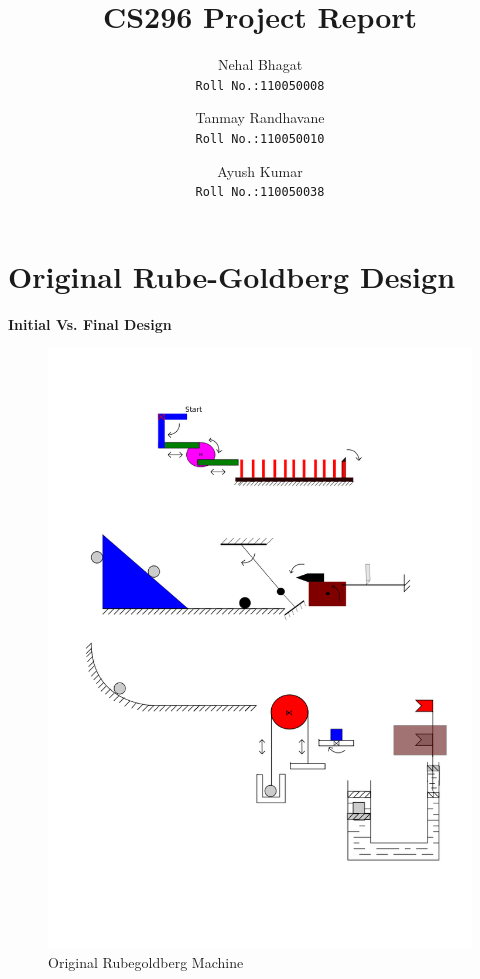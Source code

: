 \documentclass[a4paper,11pt]{article}
\title{CS296 Project Report}
\author{
  Nehal Bhagat\\
  \texttt{Roll No.:110050008}\\
  \and
  Tanmay Randhavane\\
  \texttt{Roll No.:110050010}\\
  \and
  Ayush Kumar\\
  \texttt{Roll No.:110050038}\\
}
\begin{document}
\maketitle

\newpage


\tableofcontents
\newpage

\section{Original Rube-Goldberg Design}
{
\textbf{Initial Vs. Final Design}
\begin{figure}[h]
    \centering
    \includegraphics[scale=0.45]{rube-goldberg}
    \caption{Original Rubegoldberg Machine}
\end{figure}
  
}
\end{document}
